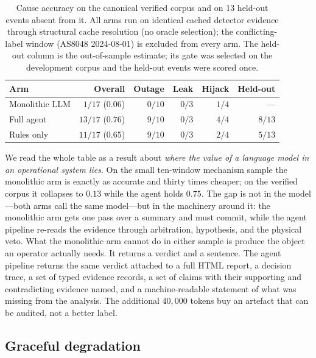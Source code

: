 \begin{table}[t]
\centering
\caption{Cause accuracy on the canonical verified corpus and on 13
held-out events absent from it. All arms run on identical cached detector
evidence through structural cache resolution (no oracle selection); the
conflicting-label window (AS8048 2024-08-01) is excluded from every arm.
The held-out column is the out-of-sample estimate; its gate was selected
on the development corpus and the held-out events were scored once.}
\label{tab:agent-gt}
\small
\setlength{\tabcolsep}{4pt}
\begin{tabular}{@{}lrrrrr@{}}
\hline
\textbf{Arm} & \textbf{Overall} & \textbf{Outage} & \textbf{Leak} & \textbf{Hijack}
  & \textbf{Held-out} \\
\hline
Monolithic LLM & $1/17$ ($0.06$) & $0/10$ & $0/3$ & $1/4$ & --- \\
Full agent     & $13/17$ ($0.76$) & $9/10$ & $0/3$ & $4/4$ & $8/13$ \\
Rules only     & $11/17$ ($0.65$) & $9/10$ & $0/3$ & $2/4$ & $5/13$ \\
\hline
\end{tabular}
\end{table}

We read the whole table as a result about \emph{where the value of a
language model in an operational system lies}. On the small ten-window
mechanism sample the monolithic arm is exactly as accurate and thirty
times cheaper; on the verified corpus it collapses to $0.13$ while the
agent holds $0.75$. The gap is not in the model---both arms call the same
model---but in the machinery around it: the monolithic arm gets one pass
over a summary and must commit, while the agent pipeline re-reads the
evidence through arbitration, hypothesis, and the physical veto. What the
monolithic arm cannot do in either sample is produce the object an operator
actually needs. It returns a verdict and a sentence. The agent pipeline
returns the same verdict attached to a full HTML report, a decision trace,
a set of typed evidence records, a set of claims with their supporting and
contradicting evidence named, and a machine-readable statement of what was
missing from the analysis. The additional $40{,}000$ tokens buy an artefact
that can be audited, not a better label.

\subsection{Graceful degradation}
\label{sec:agent-degradation}

